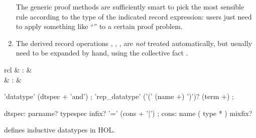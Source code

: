 \begin{isabellebody}
\begin{isamarkuptext}
\begin{enumerate}
  The generic proof methods are sufficiently smart to pick the most
  sensible rule according to the type of the indicated record
  expression: users just need to apply something like ``'' to a certain proof problem.

  \item The derived record operations , , ,  are \emph{not}
  treated automatically, but usually need to be expanded by hand,
  using the collective fact .

  \end{enumerate}%
\end{isamarkuptext}%
\isamarkuptrue%
%
\isamarkuptrue%
%
\begin{isamarkuptext}%
\begin{matharray}{rcl}
    \hypertarget{command.HOL.datatype}{\hyperlink{command.HOL.datatype}{\mbox{}}} & : &  \\
  \hypertarget{command.HOL.rep-datatype}{\hyperlink{command.HOL.rep-datatype}{\mbox{}}} & : &  \\
  \end{matharray}

  \begin{rail}
    'datatype' (dtspec + 'and')
    ;
    'rep\_datatype' ('(' (name +) ')')? (term +)
    ;

    dtspec: parname? typespec infix? '=' (cons + '|')
    ;
    cons: name ( type * ) mixfix?
  \end{rail}

  \begin{description}

  \item \hyperlink{command.HOL.datatype}{\mbox{}} defines inductive datatypes in
  HOL.


\end{description}
\end{isamarkuptext}
\end{isabellebody}
